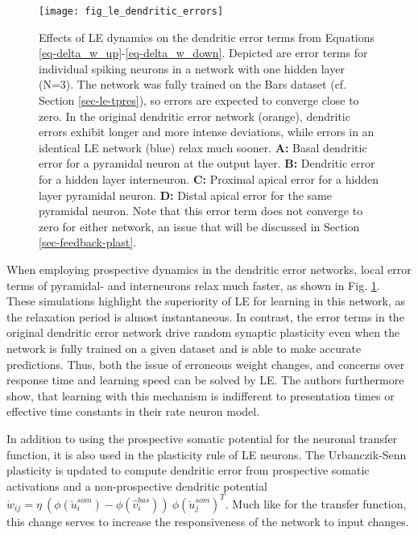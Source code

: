 \begin{figure}[h!]
  \centering
  \texttt{[image: fig\_le\_dendritic\_errors]}
  \caption[Effects of LE dynamics on dendritic error]{Effects of LE dynamics on the dendritic error terms from Equations
    \ref{eq-delta_w_up}-\ref{eq-delta_w_down}. Depicted are error terms for individual spiking neurons in a network with
    one hidden layer (N=3). The network was fully trained on the Bars dataset (cf. Section \ref{sec-le-tpres}), so
    errors are expected to converge close to zero. In the original dendritic error network (orange), dendritic errors
    exhibit longer and more intense deviations, while errors in an identical LE network (blue) relax much sooner.
    \textbf{A:} Basal dendritic error for a pyramidal neuron at the output layer. \textbf{B:} Dendritic error for a
    hidden layer interneuron. \textbf{C:} Proximal apical error for a hidden layer pyramidal neuron. \textbf{D:} Distal
    apical error for the same pyramidal neuron. Note that this error term does not converge to zero for either network,
    an issue that will be discussed in Section \ref{sec-feedback-plast}.}
  \label{fig-error-comp-le}
\end{figure}


When employing prospective dynamics in the dendritic error networks, local error terms of pyramidal- and interneurons
relax much faster, as shown in Fig. \ref{fig-error-comp-le}. These simulations highlight the superiority of LE for
learning in this network, as the relaxation period is almost instantaneous. In contrast, the error terms in the original
dendritic error network drive random synaptic plasticity even when the network is fully trained on a given dataset and
is able to make accurate predictions. Thus, both the issue of erroneous weight changes, and concerns over
response time and learning speed can be solved by LE. The authors furthermore show, that learning with this mechanism is
indifferent to presentation times or effective time constants in their rate neuron model.

In addition to using the prospective somatic potential for the neuronal transfer function, it is also used in the
plasticity rule of LE neurons. The Urbanczik-Senn plasticity is updated to compute dendritic error from
prospective somatic activations and a non-prospective dendritic potential $\dot{w}_{ij}= \eta \ (
\phi(\breve{u}_i^{som}) - \phi(\hat{v}_i^{bas}) ) \ \phi(\breve{u}_j^{som})^T$. Much like for the transfer function,
this change serves to increase the responsiveness of the network to input changes.

